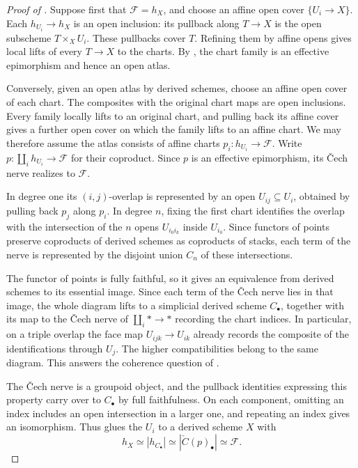 \begin{proof}[Proof of ]
Suppose first that $\mathcal F=h_X$, and choose an affine open cover
$\{U_i\to X\}$. Each $h_{U_i}\to h_X$ is an open inclusion:
its pullback along $T\to X$ is the open subscheme $T\times_X U_i$.
These pullbacks cover $T$. Refining them by affine opens gives local
lifts of every $T\to X$ to the charts. By
, the chart family is
an effective epimorphism and hence an open atlas.

Conversely, given an open atlas by derived schemes, choose an affine
open cover of each chart. The composites with the original chart maps
are open inclusions. Every family locally lifts to an original chart,
and pulling back its affine cover gives a further open cover on which
the family lifts to an affine chart. We may therefore assume the atlas
consists of affine charts $p_i\colon h_{U_i}\to\mathcal F$. Write
$p\colon\coprod_i h_{U_i}\to\mathcal F$ for their coproduct. Since $p$
is an effective epimorphism, its \v{C}ech nerve realizes to $\mathcal F$.

In degree one its $(i,j)$-overlap is represented by an open
$U_{ij}\subseteq U_i$, obtained by pulling back $p_j$ along $p_i$.
In degree $n$, fixing the first chart identifies the overlap
with the intersection of the $n$ opens $U_{i_0i_k}$ inside $U_{i_0}$.
Since functors of points preserve coproducts of derived schemes as
coproducts of stacks, each term of the nerve is represented by the
disjoint union $C_n$ of these intersections.

The functor of points is fully faithful, so it gives an equivalence
from derived schemes to its essential image. Since each term of the
\v{C}ech nerve lies in that image, the whole diagram lifts to a
simplicial derived scheme $C_\bullet$, together with its map to the
\v{C}ech nerve of $\coprod_i *\to *$ recording the chart indices.
In particular, on a triple overlap the face map $U_{ijk}\to U_{ik}$
already records the composite of the identifications through $U_j$.
The higher compatibilities belong to the same diagram. This answers the
coherence question of .

The \v{C}ech nerve is a groupoid object, and the pullback identities
expressing this property carry over to $C_\bullet$ by full faithfulness.
On each component, omitting an index includes an open intersection
in a larger one, and repeating an index gives an isomorphism.
Thus  glues the $U_i$ to a derived
scheme $X$ with
\[
  h_X\simeq |h_{C_\bullet}|\simeq |\check C(p)_\bullet|\simeq\mathcal F.
\]
\end{proof}


